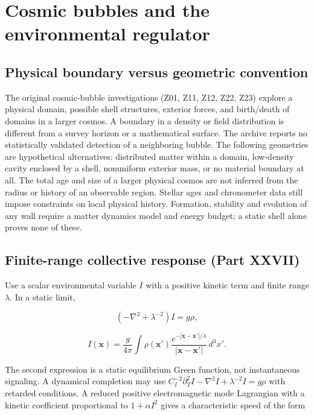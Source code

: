 \documentclass[
  11pt,
  twoside]{article}
\begin{document}
\section{Cosmic bubbles and the environmental
regulator}\label{cosmic-bubbles-and-the-environmental-regulator}

\subsection{Physical boundary versus geometric
convention}\label{physical-boundary-versus-geometric-convention}

The original cosmic-bubble investigations (Z01, Z11, Z12, Z22, Z23)
explore a physical domain, possible shell structures, exterior forces,
and birth/death of domains in a larger cosmos. A boundary in a density
or field distribution is different from a survey horizon or a
mathematical surface. The archive reports no statistically validated
detection of a neighboring bubble. The following geometries are
hypothetical alternatives: distributed matter within a domain,
low-density cavity enclosed by a shell, nonuniform exterior mass, or no
material boundary at all. The total age and size of a larger physical
cosmos are not inferred from the radius or history of an observable
region. Stellar ages and chronometer data still impose constraints on
local physical history. Formation, stability and evolution of any wall
require a matter dynamics model and energy budget; a static shell alone
proves none of these.

\subsection{Finite-range collective response (Part
XXVII)}\label{finite-range-collective-response-part-xxvii}

Use a scalar environmental variable \(I\) with a positive kinetic term
and finite range \(\lambda\). In a static limit,

\[(-\nabla^2+\lambda^{-2})I=g\rho,\]

\[I(\mathbf{x})=\frac{g}{4\pi}\int \rho(\mathbf{x}')\frac{e^{-|\mathbf{x}-\mathbf{x}'|/\lambda}}{|\mathbf{x}-\mathbf{x}'|}\,d^3x'.\]

The second expression is a static equilibrium Green function, not
instantaneous signaling. A dynamical completion may use
\(C_I^{-2}\partial_T^2 I-\nabla^2 I+\lambda^{-2}I=g\rho\) with retarded
conditions. A reduced positive electromagnetic mode Lagrangian with a
kinetic coefficient proportional to \(1+\alpha I^2\) gives a
characteristic speed of the form
\end{document}
